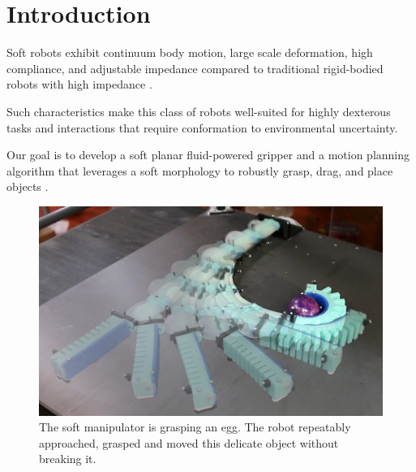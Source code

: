 \section{Introduction}

Soft robots exhibit continuum body motion, large scale deformation, high compliance, and adjustable impedance  compared to traditional rigid-bodied robots with high impedance \cite{trivedi2008soft}. 

Such characteristics make this class of robots well-suited for highly dexterous tasks and interactions that require conformation to environmental uncertainty.

Our goal is to develop a soft planar fluid-powered gripper and a motion planning algorithm that leverages a soft morphology to robustly grasp, drag, and place objects . 

\begin{figure}[htb]
\centering
   \includegraphics[width=0.99\columnwidth]{Figures/experimental_results/egg_approach/egg_approach_sequence_brighter}
   \caption{The soft manipulator is grasping an egg. The robot repeatably approached, grasped and moved this delicate object without breaking it.}
   \label{fig:egg_approach_sequence}
\end{figure}


